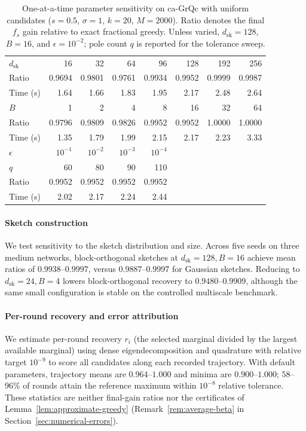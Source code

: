 \documentclass[conference]{IEEEtran}
\theoremstyle{definition}
\newcommand{\dsk}{d_{\mathrm{sk}}}
\begin{document}
\begin{table}[!t]
\centering
\caption{One-at-a-time parameter sensitivity on ca-GrQc with uniform
candidates ($s=0.5$, $\sigma=1$, $k=20$, $M=2000$). Ratio denotes
the final $f_s$ gain relative to exact fractional greedy. Unless
varied, $\dsk=128$, $B=16$, and $\epsilon=10^{-2}$; pole count $q$
is reported for the tolerance sweep.}
\label{tab:params}
\footnotesize
\setlength{\tabcolsep}{3.4pt}
\renewcommand{\arraystretch}{1.05}
\begin{tabular}{@{}lrrrrrrr@{}}
\toprule
$\dsk$ & 16 & 32 & 64 & 96 & 128 & 192 & 256\\
Ratio & 0.9694 & 0.9801 & 0.9761 & 0.9934 & 0.9952 & 0.9999 & 0.9987\\
Time (s) & 1.64 & 1.66 & 1.83 & 1.95 & 2.17 & 2.48 & 2.64\\
\midrule
$B$ & 1 & 2 & 4 & 8 & 16 & 32 & 64\\
Ratio & 0.9796 & 0.9809 & 0.9826 & 0.9952 & 0.9952 & 1.0000 & 1.0000\\
Time (s) & 1.35 & 1.79 & 1.99 & 2.15 & 2.17 & 2.23 & 3.33\\
\midrule
$\epsilon$ & $10^{-1}$ & $10^{-2}$ & $10^{-3}$ & $10^{-4}$ & & &\\
$q$ & 60 & 80 & 90 & 110 & & &\\
Ratio & 0.9952 & 0.9952 & 0.9952 & 0.9952 & & &\\
Time (s) & 2.02 & 2.17 & 2.24 & 2.44 & & &\\
\bottomrule
\end{tabular}
\end{table}

\paragraph{Sketch construction}
We test sensitivity to the sketch distribution and size. Across five seeds on three medium networks, block-orthogonal sketches
at $\dsk=128,B=16$ achieve mean ratios of $0.9938$--$0.9997$, versus
$0.9887$--$0.9997$ for Gaussian sketches. Reducing to $\dsk=24,B=4$ lowers
block-orthogonal recovery to $0.9480$--$0.9909$, although the same small
configuration is stable on the controlled multiscale benchmark.

\paragraph{Per-round recovery and error attribution}
We estimate per-round recovery $r_i$ (the selected marginal divided by
the largest available marginal) using dense eigendecomposition and
quadrature with relative target $10^{-9}$ to score all candidates along
each recorded trajectory. With default parameters, trajectory means are
$0.964$--$1.000$ and minima are $0.900$--$1.000$; $58$--$96\%$ of rounds
attain the reference maximum within $10^{-8}$ relative tolerance.
These statistics are neither final-gain ratios nor the certificates of
Lemma~\ref{lem:approximate-greedy} (Remark~\ref{rem:average-beta} in
Section~\ref{sec:numerical-errors}).
\end{document}
